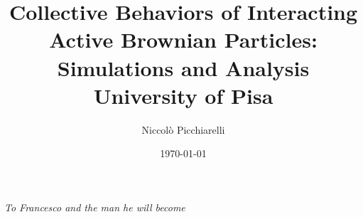 \documentclass[a4paper]{book} %
\title{
	{Collective Behaviors of Interacting Active Brownian Particles: Simulations and Analysis}\\
	{\large University of Pisa}\\
}
\author{Niccolò Picchiarelli}
\date{\today}
\begin{document}
	
	\frontmatter
	\maketitle
	
	\cleardoublepage
	\begin{flushright}
		\itshape To Francesco and the man he will become\\
	\end{flushright}
	\newpage
	
		
	
	\tableofcontents
	\listoffigures
	\listoftables
	
	\mainmatter
	

	
	
	
	
	
	
	
	
	\backmatter
	\printbibliography
\end{document}

